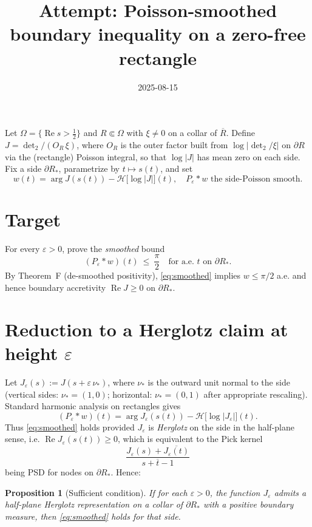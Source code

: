 \documentclass[11pt]{article}
\title{Attempt: Poisson-smoothed boundary inequality on a zero-free rectangle}
\date{2025-08-15}
\newtheorem{proposition}{Proposition}
\theoremstyle{remark}
\newcommand{\ReS}{\operatorname{Re}}
\begin{document}
\maketitle

Let $\Omega=\{\ReS s>\tfrac12\}$ and $R\Subset\Omega$ with $\xi\ne0$ on a collar of $\overline R$. Define $J=\det_2/(O_R\,\xi)$, where $O_R$ is the outer factor built from $\log|\det_2/\xi|$ on $\partial R$ via the (rectangle) Poisson integral, so that $\log|J|$ has mean zero on each side. Fix a side $\partial R_*$, parametrize by $t\mapsto s(t)$, and set
\[
w(t)=\arg J(s(t)) - \mathcal H\big[\log|J|\big](t),\quad P_\varepsilon* w\text{ the side-Poisson smooth.}
\]

\section*{Target}
For every $\varepsilon>0$, prove the \emph{smoothed} bound
\begin{equation}\label{eq:smoothed}
(P_\varepsilon * w)(t)\ \le\ \frac{\pi}{2}\quad\text{for a.e. }t\text{ on }\partial R_*.
\end{equation}
By Theorem~F (de-smoothed positivity), \eqref{eq:smoothed} implies $w\le\pi/2$ a.e. and hence boundary accretivity $\ReS J\ge 0$ on $\partial R_*$.

\section*{Reduction to a Herglotz claim at height $\varepsilon$}
Let $J_\varepsilon(s):=J(s+\varepsilon\,\nu_*)$, where $\nu_*$ is the outward unit normal to the side (vertical sides: $\nu_*=(1,0)$; horizontal: $\nu_*=(0,1)$ after appropriate rescaling). Standard harmonic analysis on rectangles gives
\[
(P_\varepsilon*w)(t)= \arg J_\varepsilon(s(t)) - \mathcal H\big[\log|J_\varepsilon|\big](t).
\]
Thus \eqref{eq:smoothed} holds provided $J_\varepsilon$ is \emph{Herglotz} on the side in the half-plane sense, i.e. $\ReS J_\varepsilon(s(t))\ge0$, which is equivalent to the Pick kernel
\[
\frac{J_\varepsilon(s)+\overline{J_\varepsilon(t)}}{s+\overline t-1}
\]
being PSD for nodes on $\partial R_*$. Hence:

\begin{proposition}[Sufficient condition]
If for each $\varepsilon>0$, the function $J_\varepsilon$ admits a half-plane Herglotz representation on a collar of $\partial R_*$ with a \emph{positive} boundary measure, then \eqref{eq:smoothed} holds for that side.
\end{proposition}
\end{document}
